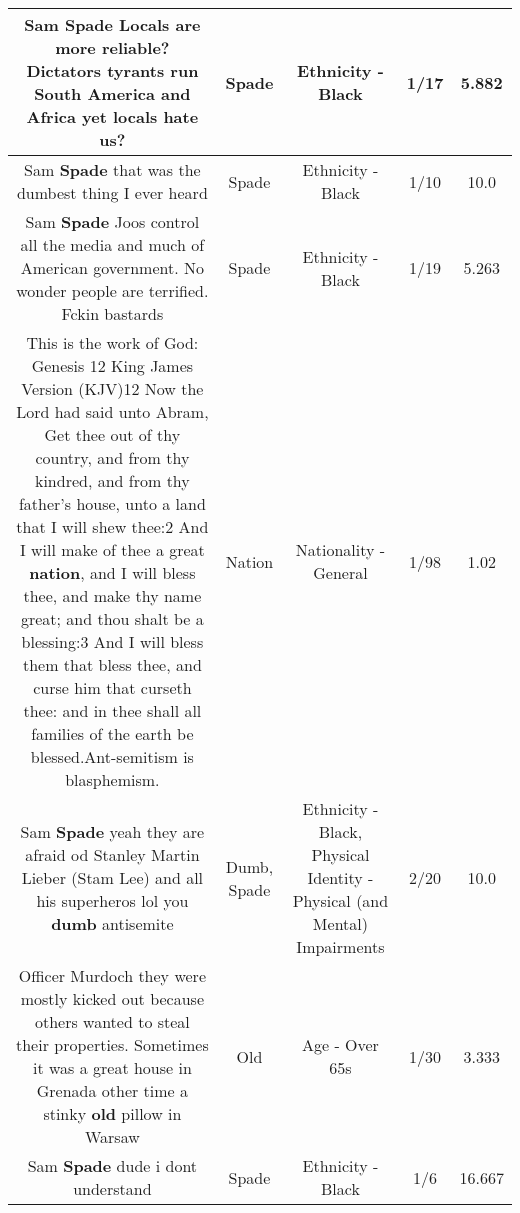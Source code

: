 \documentclass[11pt]{article}
\newlength\mylength
\begin{document}
\begin{center}
\begin{longtable}{|C{.65\mylength}|C{.30\mylength}|C{.12\mylength}|C{.12\mylength}|C{.12\mylength}|}
  \small Sam \textbf{Spade} Locals are more reliable?  Dictators tyrants run South America and Africa yet locals hate us?\normalsize   & Spade & Ethnicity - Black & 1/17 & 5.882 \\  \hline
  \small Sam \textbf{Spade} that was the dumbest thing I ever heard\normalsize   & Spade & Ethnicity - Black & 1/10 & 10.0 \\  \hline
  \small Sam \textbf{Spade} Joos control all the media and much of American government. No wonder people are terrified.  Fckin bastards\normalsize   & Spade & Ethnicity - Black & 1/19 & 5.263 \\  \hline
  \small This is the work of God: Genesis 12 King James Version (KJV)12 Now the Lord had said unto Abram, Get thee out of thy country, and from thy kindred, and from thy father's house, unto a land that I will shew thee:2 And I will make of thee a great \textbf{nation}, and I will bless thee, and make thy name great; and thou shalt be a blessing:3 And I will bless them that bless thee, and curse him that curseth thee: and in thee shall all families of the earth be blessed.Ant-semitism is blasphemism.\normalsize   & Nation & Nationality - General & 1/98 & 1.02 \\  \hline
  \small Sam \textbf{Spade} yeah they are afraid od Stanley Martin Lieber (Stam Lee) and all his superheros lol you \textbf{dumb} antisemite\normalsize   & Dumb, Spade & Ethnicity - Black, Physical Identity - Physical (and Mental) Impairments & 2/20 & 10.0 \\  \hline
  \small Officer Murdoch they were mostly kicked out because others wanted to steal their properties. Sometimes it was a great house in Grenada other time a stinky \textbf{old} pillow in Warsaw\normalsize   & Old & Age - Over 65s & 1/30 & 3.333 \\  \hline
  \small Sam \textbf{Spade} dude i dont understand\normalsize   & Spade & Ethnicity - Black & 1/6 & 16.667 \\  \hline

\end{longtable}
\end{center}
\end{document}
